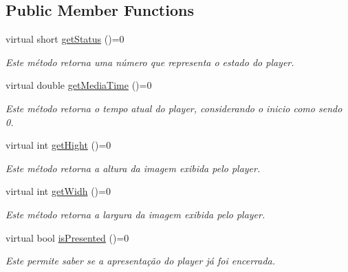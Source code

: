 \subsection*{Public Member Functions}
\begin{DoxyCompactItemize}
\item 
virtual short \hyperlink{classbr_1_1ufscar_1_1lince_1_1ginga_1_1wac_1_1state_1_1IElementaryState_a6df6b08801327e6b2c06c428119caba9}{getStatus} ()=0
\begin{DoxyCompactList}\small\item\em Este método retorna uma número que representa o estado do player. \item\end{DoxyCompactList}\item 
virtual double \hyperlink{classbr_1_1ufscar_1_1lince_1_1ginga_1_1wac_1_1state_1_1IElementaryState_a2dd09dc8dcee4eb6a4b23fe4d1f001ad}{getMediaTime} ()=0
\begin{DoxyCompactList}\small\item\em Este método retorna o tempo atual do player, considerando o inicio como sendo 0. \item\end{DoxyCompactList}\item 
virtual int \hyperlink{classbr_1_1ufscar_1_1lince_1_1ginga_1_1wac_1_1state_1_1IElementaryState_a22990483a86a4fdb0d8203c2f96f701c}{getHight} ()=0
\begin{DoxyCompactList}\small\item\em Este método retorna a altura da imagem exibida pelo player. \item\end{DoxyCompactList}\item 
virtual int \hyperlink{classbr_1_1ufscar_1_1lince_1_1ginga_1_1wac_1_1state_1_1IElementaryState_a13218fa1e799a3aabc8f20ffd7c134f5}{getWidh} ()=0
\begin{DoxyCompactList}\small\item\em Este método retorna a largura da imagem exibida pelo player. \item\end{DoxyCompactList}\item 
virtual bool \hyperlink{classbr_1_1ufscar_1_1lince_1_1ginga_1_1wac_1_1state_1_1IElementaryState_a2d7a7f8c9945df9ad15d87863a1d288e}{isPresented} ()=0
\begin{DoxyCompactList}\small\item\em Este permite saber se a apresentação do player já foi encerrada. \item\end{DoxyCompactList}\item 

\end{DoxyCompactItemize}
